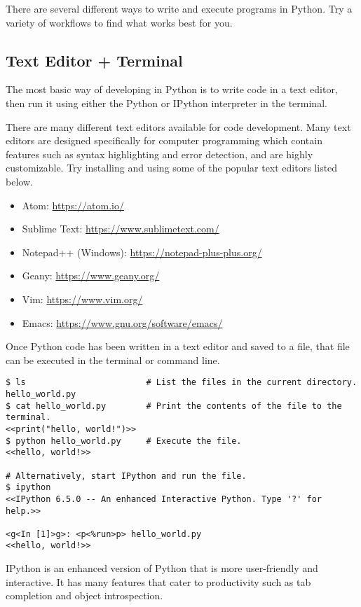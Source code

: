 There are several different ways to write and execute programs in Python.
Try a variety of workflows to find what works best for you.

\subsection*{Text Editor + Terminal} %

The most basic way of developing in Python is to write code in a text editor, then run it using either the Python or IPython interpreter in the terminal.

There are many different text editors available for code development. Many text editors are designed specifically for computer programming which contain features such as syntax highlighting and error detection, and are highly customizable.
Try installing and using some of the popular text editors listed below.
\begin{itemize}
\item Atom: \url{https://atom.io/}
\item Sublime Text: \url{https://www.sublimetext.com/}
\item Notepad++ (Windows): \url{https://notepad-plus-plus.org/}
\item Geany: \url{https://www.geany.org/}
\item Vim: \url{https://www.vim.org/}
\item Emacs: \url{https://www.gnu.org/software/emacs/}
\end{itemize}

Once Python code has been written in a text editor and saved to a file, that file can be executed in the terminal or command line.
\begin{lstlisting}
$ ls                        # List the files in the current directory.
hello_world.py
$ cat hello_world.py        # Print the contents of the file to the terminal.
<<print("hello, world!")>>
$ python hello_world.py     # Execute the file.
<<hello, world!>>

# Alternatively, start IPython and run the file.
$ ipython
<<IPython 6.5.0 -- An enhanced Interactive Python. Type '?' for help.>>

<g<In [1]>g>: <p<%run>p> hello_world.py
<<hello, world!>>
\end{lstlisting}

IPython is an enhanced version of Python that is more user-friendly and interactive.
It has many features that cater to productivity such as tab completion and object introspection.

